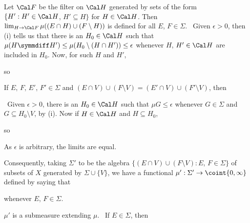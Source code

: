 {\medskip

 Let $\Cal F$ be the filter on $\Cal H$
generated by sets of the form $\{H':H'\in\Cal H$, $H'\subseteq H\}$ for
$H\in\Cal H$.   Then
$\lim_{H\to\Cal F}\mu((E\cap H)\cup(F\setminus H))$ is defined for all
$E$, $F\in\Sigma$.   \Prf\ Given $\epsilon>0$, then (i) tells us that there
is an $H_0\in\Cal H$ such that
$\mu(H\symmdiff H')\le\mu(H_0\setminus(H\cap H'))\le\epsilon$ whenever $H$,
$H'\in\Cal H$ are included in $H_0$.   Now, for such $H$ and $H'$,


\noindent so


\medskip

 If $E$, $F$, $E'$, $F'\in\Sigma$ and
$(E\cap V)\cup(F\setminus V)=(E'\cap V)\cup(F'\setminus V)$, then


\noindent\Prf\ Given $\epsilon>0$, there is an $H_0\in\Cal H$ such that
$\mu G\le\epsilon$ whenever $G\in\Sigma$ and $G\subseteq H_0\setminus V$,
by (i).   Now if $H\in\Cal H$ and $H\subseteq H_0$,


\noindent so


\noindent As $\epsilon$ is arbitrary, the limits are equal.\ \Qed

\medskip

 Consequently, taking $\Sigma'$ to be the algebra
$\{(E\cap V)\cup(F\setminus V):E$, $F\in\Sigma\}$ of subsets of $X$
generated by $\Sigma\cup\{V\}$, we have a
functional $\mu':\Sigma'\to\coint{0,\infty}$ defined by saying that


\noindent whenever $E$, $F\in\Sigma$.

\medskip

 $\mu'$ is a submeasure extending $\mu$.
\Prf\ If $E\in\Sigma$, then

}
